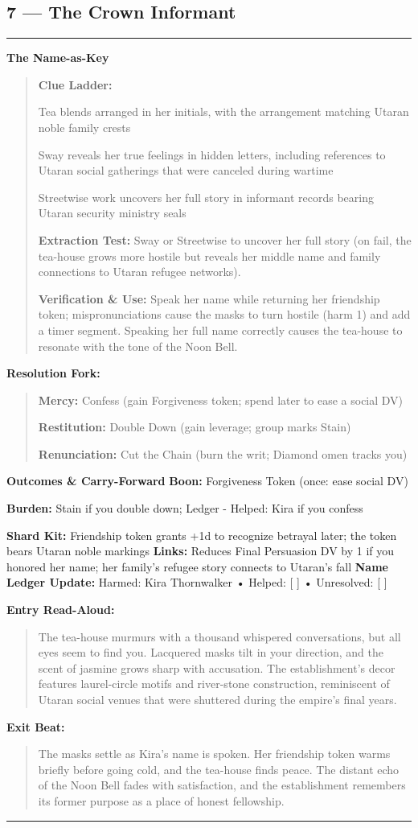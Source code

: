\documentclass[18pt, letterpaper, twoside]{article}
\newenvironment{floorbox}[1]{%
    \begin{center}
    \begin{minipage}{0.95\textwidth}
    \subsection*{#1}
    \vspace{-0.5em}
    \rule{\textwidth}{0.5pt}
    \vspace{0.5em}
}{%
    \vspace{0.5em}
    \rule{\textwidth}{0.5pt}
    \end{minipage}
    \end{center}
}
\newenvironment{gmnote}[1]{%
    \vspace{0.5em}
    \noindent\textbf{#1}
    \begin{quote}
}{%
    \end{quote}
    \vspace{0.5em}
}
\newenvironment{resolutionbox}{%
    \vspace{0.5em}
    \noindent\textbf{Resolution Fork:}
    \begin{quote}
}{%
    \end{quote}
    \vspace{0.5em}
}
\newenvironment{boxedtext}[1]{%
    \vspace{0.5em}
    \noindent\textbf{#1}
    \begin{quote}
}{%
    \end{quote}
    \vspace{0.5em}
}
\newcommand{\boon}[1]{\noindent\textbf{Boon:} #1\par}
\newcommand{\burden}[1]{\noindent\textbf{Burden:} #1\par}
\newcommand{\entrytext}[1]{\begin{boxedtext}{Entry Read-Aloud:} #1 \end{boxedtext}}
\newcommand{\exittext}[1]{\begin{boxedtext}{Exit Beat:} #1 \end{boxedtext}}
\begin{document}
\begin{floorbox}{7 --- The Crown Informant}
\begin{gmnote}{The Name-as-Key}
\textbf{Clue Ladder:}
\begin{description}[leftmargin=*, style=unboxed]
    \item[Gentle Nudge:] Tea blends arranged in her initials, with the arrangement matching Utaran noble family crests
    \item[Actionable Lead:] Sway reveals her true feelings in hidden letters, including references to Utaran social gatherings that were canceled during wartime
    \item[Aha! Proof:] Streetwise work uncovers her full story in informant records bearing Utaran security ministry seals
\end{description}

\textbf{Extraction Test:} Sway or Streetwise to uncover her full story (on fail, the tea-house grows more hostile but reveals her middle name and family connections to Utaran refugee networks).

\textbf{Verification \& Use:} Speak her name while returning her friendship token; mispronunciations cause the masks to turn hostile (harm 1) and add a timer segment. Speaking her full name correctly causes the tea-house to resonate with the tone of the Noon Bell.
\end{gmnote}

\begin{resolutionbox}
\textbf{Mercy:} Confess (gain Forgiveness token; spend later to ease a social DV)

\textbf{Restitution:} Double Down (gain leverage; group marks Stain)

\textbf{Renunciation:} Cut the Chain (burn the writ; Diamond omen tracks you)
\end{resolutionbox}

\textbf{Outcomes \& Carry-Forward}
\boon{Forgiveness Token (once: ease social DV)}
\burden{Stain if you double down; Ledger - Helped: Kira if you confess}
\textbf{Shard Kit:} Friendship token grants +1d to recognize betrayal later; the token bears Utaran noble markings
\textbf{Links:} Reduces Final Persuasion DV by 1 if you honored her name; her family's refugee story connects to Utaran's fall
\textbf{Name Ledger Update:} Harmed: Kira Thornwalker • Helped: [ ] • Unresolved: [ ]

\entrytext{The tea-house murmurs with a thousand whispered conversations, but all eyes seem to find you. Lacquered masks tilt in your direction, and the scent of jasmine grows sharp with accusation. The establishment's decor features laurel-circle motifs and river-stone construction, reminiscent of Utaran social venues that were shuttered during the empire's final years.}

\exittext{The masks settle as Kira's name is spoken. Her friendship token warms briefly before going cold, and the tea-house finds peace. The distant echo of the Noon Bell fades with satisfaction, and the establishment remembers its former purpose as a place of honest fellowship.}
\end{floorbox}
\end{document}
